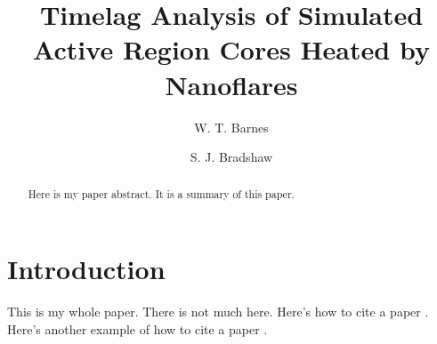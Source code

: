 \documentclass[twocolumn]{aastex61}
\begin{document}
\title{Timelag Analysis of Simulated Active Region Cores Heated by Nanoflares}

\author{W. T. Barnes}
\author{S. J. Bradshaw}

\begin{abstract}
Here is my paper abstract. It is a summary of this paper.
\end{abstract}



\section{Introduction}\label{introduction}

This is my whole paper. There is not much here. Here's how to cite a
paper \citet{viall_evidence_2012}. Here's another example of how to cite
a paper \citep{warren_constraints_2011}.



\end{document}
